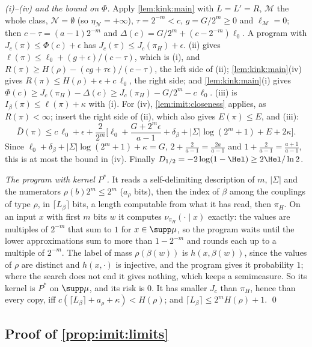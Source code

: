 \emph{(i)--(iv) and the bound on $\Phi$.} Apply \cref{lem:kink:main} with $L=L'=R$, $\mathcal M$ the whole class, $\mathcal N=\emptyset$ (so $\eta_{\mathcal N}=+\infty$), $\tau=2^{-m}<c$, $g=G/2^m\ge0$ and $\ell_{\mathcal M}=0$; then $c-\tau=(a-1)2^{-m}$ and $\Delta(c)=G/2^m+(c-2^{-m})\ell_0$. A program with $J_c(\pi)\le\Phi(c)+\epsilon$ has $J_c(\pi)\le J_c(\pi_H)+\epsilon$. (ii) gives $\ell(\pi)\le\ell_0+(g+\epsilon)/(c-\tau)$, which is (i), and $R(\pi)\ge H(\rho)-(cg+\tau\epsilon)/(c-\tau)$, the left side of (ii); \cref{lem:kink:main}(iv) gives $R(\pi)\le H(\rho)+\epsilon+c\,\ell_0$, the right side; and \cref{lem:kink:main}(i) gives $\Phi(c)\ge J_c(\pi_H)-\Delta(c)\ge J_c(\pi_H)-G/2^m-c\,\ell_0$. (iii) is $I_\beta(\pi)\le\ell(\pi)+\kappa$ with (i). For (iv), \cref{lem:imit:closeness} applies, as $R(\pi)<\infty$; insert the right side of (ii), which also gives $E(\pi)\le E$, and (iii):
\[
\bar D(\pi)\le c\,\ell_0+\epsilon+\frac2{2^m}\Big[\ell_0+\frac{G+2^m\epsilon}{a-1}+\delta_\beta+|\Sigma|\log(2^m+1)+E+2\kappa\Big].
\]
Since $\ell_0+\delta_\beta+|\Sigma|\log(2^m+1)+\kappa=G$, $2+\frac2{a-1}=\frac{2a}{a-1}$ and $1+\frac2{a-1}=\frac{a+1}{a-1}$, this is at most the bound in (iv). Finally $D_{1/2}=-2\log(1-\Hel)\ge2\Hel/\ln2$.

\emph{The program with kernel $P^*$.} It reads a self-delimiting description of $m$, $|\Sigma|$ and the numerators $\rho(b)2^m\le2^m$ ($a_\rho$ bits), then the index of $\beta$ among the couplings of type $\rho$, in $\lceil L_\beta\rceil$ bits, a length computable from what it has read, then $\pi_H$. On an input $x$ with first $m$ bits $w$ it computes $\nu_{\pi_H}(\cdot\mid x)$ exactly: the values are multiples of $2^{-m}$ that sum to $1$ for $x\in\supp\mu$, so the program waits until the lower approximations sum to more than $1-2^{-m}$ and rounds each up to a multiple of $2^{-m}$. The label of mass $\rho(\beta(w))$ is $h(x,\beta(w))$, since the values of $\rho$ are distinct and $h(x,\cdot)$ is injective, and the program gives it probability $1$; where the search does not end it gives nothing, which keeps a semimeasure. So its kernel is $P^*$ on $\supp\mu$, and its risk is $0$. It has smaller $J_c$ than $\pi_H$, hence than every copy, iff $c(\lceil L_\beta\rceil+a_\rho+\kappa)<H(\rho)$; and $\lceil L_\beta\rceil\le2^mH(\rho)+1$. \qed

\subsection{Proof of \texorpdfstring{\cref{prop:imit:limits}}{the limits of imitation}}\label{app:imit:limits}

